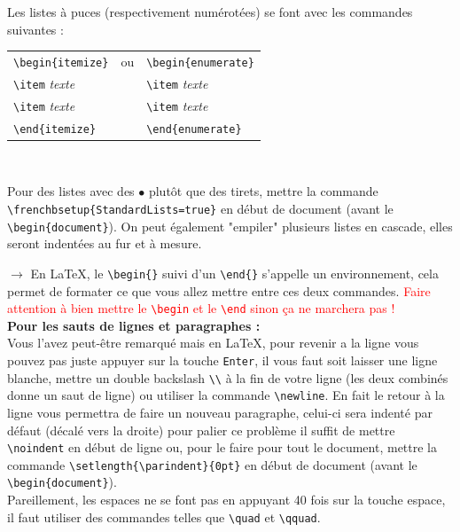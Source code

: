 \documentclass[11pt]{article}				%
\newcommand{\tb}{\textbackslash}
\begin{document}
\begin{multicols}{2}


\noindent Les listes à puces (respectivement numérotées) se font avec les commandes suivantes : \\

\begin{tabular}{lcl}

\verb?\begin{itemize}? & ou & \verb?\begin{enumerate}? \\
\indent \verb?\item? \emph{texte} &  & \indent \verb?\item? \emph{texte} \\
\indent \verb?\item? \emph{texte} &  & \indent \verb?\item? \emph{texte} \\
\verb?\end{itemize}? &  & \verb?\end{enumerate}? \\

\end{tabular} \\

\columnbreak

Pour des listes avec des $\bullet$ plutôt que des tirets, mettre la commande \texttt{\tb frenchbsetup\{StandardLists=true\}} en début de document (avant le \texttt{\tb begin\{document\}}). On peut également "empiler" plusieurs listes en cascade, elles seront indentées au fur et à mesure.
\end{multicols}

$\rightarrow$ En LaTeX, le \texttt{\tb begin\{\}} suivi d'un \texttt{\tb end\{\}} s'appelle un environnement, cela permet de formater ce que vous allez mettre entre ces deux commandes. \textcolor{red}{Faire attention à bien mettre le \texttt{\tb begin} et le \texttt{\tb end} sinon ça ne marchera pas !} \\
\clearpage
\textbf{Pour les sauts de lignes et paragraphes :} \\

Vous l'avez peut-être remarqué mais en LaTeX, pour revenir a la ligne vous pouvez pas juste appuyer sur la touche \texttt{Enter}, il vous faut soit laisser une ligne blanche, mettre un double backslash \texttt{\tb \tb} à la fin de votre ligne (les deux combinés donne un saut de ligne) ou utiliser la commande \texttt{\tb newline}.
En fait le retour à la ligne vous permettra de faire un nouveau paragraphe, celui-ci sera indenté par défaut (décalé vers la droite) pour palier ce problème il suffit de mettre \texttt{\tb noindent} en début de ligne ou, pour le faire pour tout le document, mettre la commande \texttt{\tb setlength\{\tb parindent\}\{0pt\}} en début de document (avant le \texttt{\tb begin\{document\}}).\\
Pareillement, les espaces ne se font pas en appuyant 40 fois sur la touche espace, il faut utiliser des commandes telles que \texttt{\tb quad} et \texttt{\tb qquad}.
\end{document}
